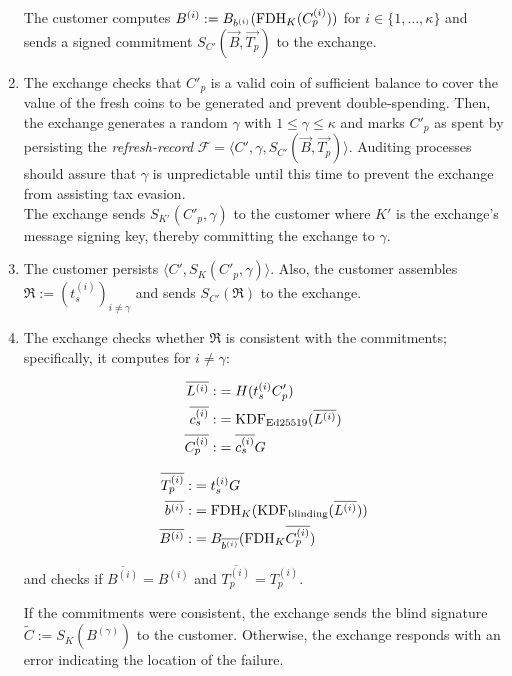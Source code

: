 \documentclass[sigconf, authordraft]{acmart}
\begin{document}
\begin{enumerate}
    The customer computes $B^{(i)} := B_{b^{(i)}}(\textrm{FDH}_K(C^{(i)}_p))$
    for $i \in \{1,\ldots,\kappa\}$ and sends a signed commitment
     $S_{C'}(\vec{B}, \vec{T_p})$ to the exchange.
  \item %
    The exchange checks that $C'_p$ is a valid coin of sufficient balance
    to cover the value of the fresh coins to be generated and prevent
    double-spending.  Then,
    the exchange generates a random $\gamma$ with $1 \le \gamma \le \kappa$ and
    marks $C'_p$ as spent by persisting the \emph{refresh-record}
    $\mathcal{F} = \langle C', \gamma, S_{C'}(\vec{B}, \vec{T_p}) \rangle$.
    Auditing processes should assure that $\gamma$ is unpredictable until
    this time to prevent the exchange from assisting tax evasion. \\
    The exchange sends $S_{K'}(C'_p, \gamma)$ to the customer where
    $K'$ is the exchange's message signing key, thereby committing the exchange to $\gamma$.
  \item %
    The customer persists $\langle C', S_K(C'_p, \gamma) \rangle$.
    Also, the customer assembles
      $\mathfrak{R} := \left(t_s^{(i)}\right)_{i \ne \gamma}$
    and sends $S_{C'}(\mathfrak{R})$ to the exchange.
  \item %
    The exchange checks whether $\mathfrak{R}$ is consistent with
    the commitments; specifically, it computes for $i \not= \gamma$:

    \vspace{-2ex}
    \begin{minipage}{3.5cm}
    \begin{align*}
      \overline{L^{(i)}} :&= H(t_s^{(i)} C_p') \\
      \overline{c_s^{(i)}} :&= \textrm{KDF}_{\textrm{Ed25519}}(\overline{L^{(i)}}) \\
      \overline{C^{(i)}_p} :&= \overline{c_s^{(i)}} G
     \end{align*}
    \end{minipage}
    \begin{minipage}{3cm}
     \begin{align*}
       \overline{T_p^{(i)}} :&= t_s^{(i)} G \\
       \overline{b^{(i)}} :&= \textrm{FDH}_K(\textrm{KDF}_{\textrm{blinding}}(\overline{L^{(i)}})) \\
       \overline{B^{(i)}} :&= B_{\overline{b^{(i)}}}(\textrm{FDH}_K\overline{C_p^{(i)}})
     \end{align*}
    \end{minipage}

    and checks if $\overline{B^{(i)}} = B^{(i)}$
    and $\overline{T^{(i)}_p} = T^{(i)}_p$.

    If the commitments were consistent, the exchange sends the
    blind signature $\widetilde{C} := S_{K}(B^{(\gamma)})$ to the customer.
    Otherwise, the exchange responds with an error indicating
     the location of the failure.
\end{enumerate}
\end{document}
